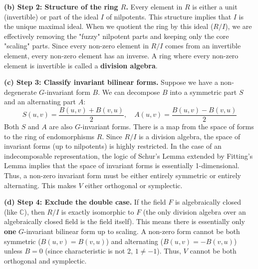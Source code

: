 \begin{solution}
\textbf{(b) Step 2: Structure of the ring $R$.}
Every element in $R$ is either a unit (invertible) or part of the ideal $I$ of nilpotents.
This structure implies that $I$ is the unique maximal ideal. When we quotient the ring by this ideal ($R/I$), we are effectively removing the "fuzzy" nilpotent parts and keeping only the core "scaling" parts. 
Since every non-zero element in $R/I$ comes from an invertible element, every non-zero element has an inverse. A ring where every non-zero element is invertible is called a \textbf{division algebra}.

\textbf{(c) Step 3: Classify invariant bilinear forms.}
Suppose we have a non-degenerate $G$-invariant form $B$. We can decompose $B$ into a symmetric part $S$ and an alternating part $A$:
\[ S(u, v) = \frac{B(u, v) + B(v, u)}{2}, \quad A(u, v) = \frac{B(u, v) - B(v, u)}{2} \]
Both $S$ and $A$ are also $G$-invariant forms. 
There is a map from the space of forms to the ring of endomorphisms $R$. Since $R/I$ is a division algebra, the space of invariant forms (up to nilpotents) is highly restricted. 
In the case of an indecomposable representation, the logic of Schur's Lemma extended by Fitting's Lemma implies that the space of invariant forms is essentially 1-dimensional. 
Thus, a non-zero invariant form must be either entirely symmetric or entirely alternating. This makes $V$ either orthogonal or symplectic.

\textbf{(d) Step 4: Exclude the double case.}
If the field $F$ is algebraically closed (like $\mathbb{C}$), then $R/I$ is exactly isomorphic to $F$ (the only division algebra over an algebraically closed field is the field itself).
This means there is essentially only \textbf{one} $G$-invariant bilinear form up to scaling.
A non-zero form cannot be both symmetric ($B(u,v)=B(v,u)$) and alternating ($B(u,v)=-B(v,u)$) unless $B=0$ (since characteristic is not 2, $1 \neq -1$).
Thus, $V$ cannot be both orthogonal and symplectic.
\end{solution}

